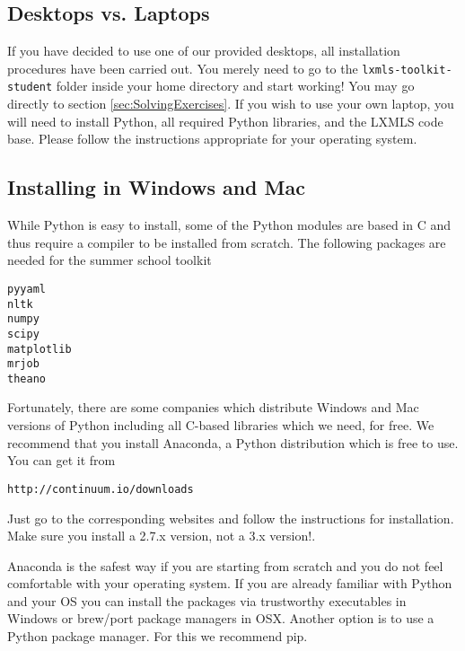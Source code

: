 \subsection{Desktops vs. Laptops}

If you have decided to use one of our provided desktops, all installation
procedures have been carried out. You merely need to go to the
\verb+lxmls-toolkit-student+ folder inside your home directory and start
working! You may go directly to section \ref{sec:SolvingExercises}.  If you
wish to use your own laptop, you will need to install Python, all
required Python libraries, and the LXMLS code base. Please follow the
instructions appropriate for your operating system.

\subsection{Installing in Windows and Mac}

While Python is easy to install, some of the Python modules are based in C and
thus require a compiler to be installed from scratch. The following packages
are needed for the summer school toolkit 

\begin{verbatim}
pyyaml
nltk
numpy
scipy
matplotlib
mrjob
theano 
\end{verbatim}

Fortunately, there are some companies which distribute Windows and Mac versions
of Python including all C-based libraries which we need, for free. We recommend
that you install Anaconda, a Python distribution which is free to use. You can
get it from 

\begin{verbatim}http://continuum.io/downloads\end{verbatim}

\noindent Just go to the corresponding websites and follow the instructions for
installation. Make sure you install a 2.7.x version, not a 3.x version!.

Anaconda is the safest way if you are starting from scratch and you do not
feel comfortable with your operating system. If you are already familiar with
Python and your OS you can install the packages via trustworthy executables 
in Windows or brew/port package managers in OSX. Another option is to use 
a Python package manager. For this we recommend pip.  


%

